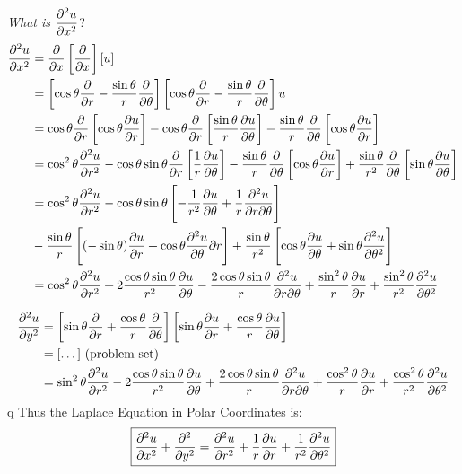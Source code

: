 \documentclass[twoside]{scrartcl}
\begin{document}
\begin{enumerate}
\emph{What is $\dfrac{\partial^2u}{\partial x^2}$}?
\setlength{\jot}{8pt}
\[\begin{aligned}
  \frac{\partial^2u}{\partial x^2} 
  &= \frac{\partial}{\partial x}\left[\frac{\partial}{\partial x}\right][u]\\
  &= \left[\cos\theta\frac{\partial}{\partial r} - \frac{\sin\theta}{r}\frac{\partial}{\partial \theta}\right]\left[\cos\theta \frac{\partial}{\partial r} - \frac{\sin\theta}{r}\frac{\partial}{\partial \theta}\right]u\\
  &= \cos\theta\frac{\partial}{\partial r}\left[\cos\theta\frac{\partial u}{\partial r}\right] - \cos\theta\frac{\partial}{\partial r}\left[\frac{\sin\theta}{r}\frac{\partial u}{\partial \theta}\right] - \frac{\sin\theta}{r}\frac{\partial}{\partial \theta}\left[\cos\theta\frac{\partial u}{\partial r}\right]\\
  &= \cos^2\theta\frac{\partial^2u}{\partial r^2}-\cos\theta\sin\theta\frac{\partial}{\partial r}\left[\frac{1}{r}\frac{\partial u}{\partial \theta}\right] - \frac{\sin\theta}{r}\frac{\partial}{\partial \theta}\left[\cos\theta\frac{\partial u}{\partial r}\right] + \frac{\sin\theta}{r^2}\frac{\partial}{\partial \theta}\left[\sin\theta\frac{\partial u}{\partial \theta}\right] \\ 
  &= \cos^2\theta\frac{\partial^2u}{\partial r^2} - \cos\theta\sin\theta\left[-\frac{1}{r^2}\frac{\partial u}{\partial \theta} + \frac{1}{r}\frac{\partial^2u}{\partial r\partial \theta}\right]\\ 
  &- \frac{\sin\theta}{r}\left[(-\sin\theta)\frac{\partial u}{\partial r} + \cos\theta \frac{\partial^2u}{\partial \theta}{\partial r}\right] + \frac{\sin\theta}{r^2}\left[\cos\theta\frac{\partial u}{\partial \theta} + \sin\theta\frac{\partial^2u}{\partial \theta^2}\right]\\
  &= \cos^2\theta \frac{\partial^2u}{\partial r^2} + 2\frac{\cos\theta\sin\theta}{r^2}\frac{\partial u}{\partial \theta} - \frac{2\cos\theta\sin\theta}{r}\frac{\partial^2u}{\partial r\partial \theta} + \frac{\sin^2\theta}{r}\frac{\partial u}{\partial r} + \frac{\sin^2\theta}{r^2}\frac{\partial^2u}{\partial\theta^2}
  \end{aligned}
\]

\[
\begin{aligned}
  \frac{\partial^2u}{\partial y^2} 
  &= \left[\sin\theta\frac{\partial}{\partial r} + \frac{\cos\theta}{r}\frac{\partial }{\partial \theta}\right]
  \left[\sin\theta \frac{\partial u}{\partial r} + \frac{\cos\theta}{r}\frac{\partial u}{\partial \theta}\right] \\
  &= [\dots] \text{ (problem set)}\\
  &= \sin^2\theta \frac{\partial^2u}{\partial r^2} - 2\frac{\cos\theta\sin\theta}{r^2}\frac{\partial u}{\partial \theta} +\frac{2\cos\theta\sin\theta}{r}\frac{\partial^2u}{\partial r\partial \theta} + \frac{\cos^2\theta}{r}\frac{\partial u}{\partial r} + \frac{\cos^2\theta}{r^2}\frac{\partial^2u}{\partial\theta^2}
\end{aligned}
\]
q
Thus the Laplace Equation in Polar Coordinates is: 
\[\boxed{\frac{\partial^2u}{\partial x^2} + \frac{\partial^2}{\partial y^2} = \frac{\partial^2u}{\partial r^2} + \frac{1}{r}\frac{\partial u}{\partial r} + \frac{1}{r^2}\frac{\partial^2u}{\partial \theta^2}}\]
\end{enumerate}
\end{document}
